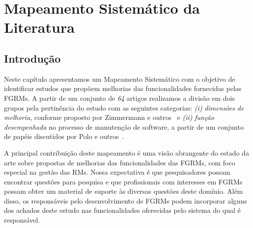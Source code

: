 
\chapter{Mapeamento Sistemático da Literatura}
\label{ch:mapeamento-sistematico}

\section{Introdução}
\label{sec:map-intro}



Neste capítulo apresentamos um Mapeamento Sistemático com o objetivo de
identificar estudos que propõem melhorias das funcionalidades fornecidas pelas
FGRMs. A partir de um conjunto de \textit{64} artigos realizamos a divisão em
dois grupos pela pertinência do estudo com as seguintes categorias: \textit{(i)}
\textit{dimensões de melhoria}, conforme proposto por Zimmermann e
outros~\cite{zimmermann2009improving} e \textit{(ii)} \textit{função
	desempenhada} no processo de manutenção de software, a partir de um conjunto
de papéis discutidos por Polo e outros~\cite{Polo1999}.

A principal contribuição deste mapeamento é uma visão abrangente do estado da
arte sobre propostas de melhorias das funcionalidades das FGRMs, com foco
especial na gestão das RMs. Nossa expectativa é que pesquisadores possam
encontrar questões para pesquisa e que profissionais com interesses em FGRMs
possam obter um material de suporte às diversas questões deste domínio. Além
disso, os responsáveis pelo desenvolvimento de FGRMs podem incorporar alguns dos
achados deste estudo nas funcionalidades oferecidas pelo sistema do qual é
responsável.

